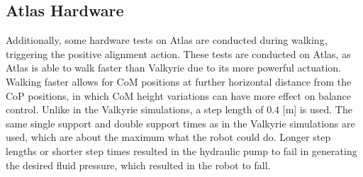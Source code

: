 \subsection{Atlas Hardware}
Additionally, some hardware tests on Atlas are conducted during walking, triggering the positive alignment action. These tests are conducted on Atlas, as Atlas is able to walk faster than Valkyrie due to its more powerful actuation. Walking faster allows for \ac{CoM} positions at further horizontal distance from the \ac{CoP} positions, in which \ac{CoM} height variations can have more effect on balance control. Unlike in the Valkyrie simulations, a step length of $0.4$ [m] is used. The same single support and double support times as in the Valkyrie simulations are used, which are about the maximum what the robot could do. Longer step lengths or shorter step times resulted in the hydraulic pump to fail in generating the desired fluid pressure, which resulted in the robot to fall.

